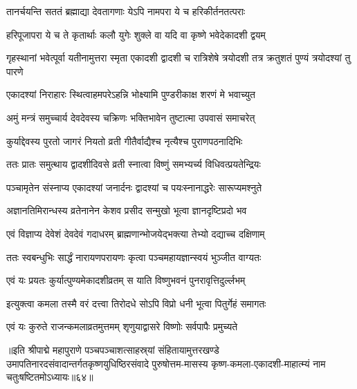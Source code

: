\twolineshloka
{तानर्चयन्ति सततं ब्रह्माद्या देवतागणाः}
{येऽपि नामपरा ये च हरिकीर्तनतत्पराः}%

\twolineshloka
{हरिपूजापरा ये च ते कृतार्थाः कलौ युगेः}
{शुक्ले वा यदि वा कृष्णे भवेदेकादशी द्वयम्}%

\threelineshloka
{गृहस्थानां भवेत्पूर्वा यतीनामुत्तरा स्मृता}
{एकादशी द्वादशी च रात्रिशेषे त्रयोदशी}
{तत्र क्रतुशतं पुण्यं त्रयोदश्यां तु पारणे}%

\twolineshloka
{एकादश्यां निराहारः स्थित्वाहमपरेऽहन्नि}
{भोक्ष्यामि पुण्डरीकाक्ष शरणं मे भवाच्युत}%

\twolineshloka
{अमुं मन्त्रं समुच्चार्य देवदेवस्य चक्रिणः}
{भक्तिभावेन तुष्टात्मा उपवासं समाचरेत्}%

\twolineshloka
{कुर्याद्देवस्य पुरतो जागरं नियतो व्रती}
{गीतैर्वाद्यैश्च नृत्यैश्च पुराणपठनादिभिः}%

\twolineshloka
{ततः प्रातः समुत्थाय द्वादशीदिवसे व्रती}
{स्नात्वा विष्णुं समभ्यर्च्य विधिवत्प्रयतेन्द्रियः}%

\twolineshloka
{पञ्चामृतेन संस्नाप्य एकादश्यां जनार्दनः}
{द्वादश्यां च पयःस्नानाद्धरेः सारूप्यमश्नुते}%

\twolineshloka
{अज्ञानतिमिरान्धस्य व्रतेनानेन केशव}
{प्रसीद सन्मुखो भूत्वा ज्ञानदृष्टिप्रदो भव}%

\twolineshloka
{एवं विज्ञाप्य देवेशं देवदेवं गदाधरम्}
{ब्राह्मणान्भोजयेद्भक्त्या तेभ्यो दद्याच्च दक्षिणाम्}%

\twolineshloka
{ततः स्वबन्धुभिः सार्द्धं नारायणपरायणः}
{कृत्वा पञ्चमहायज्ञान्स्वयं भुञ्जीत वाग्यतः}%

\twolineshloka
{एवं यः प्रयतः कुर्यात्पुण्यमेकादशीव्रतम्}
{स याति विष्णुभवनं पुनरावृत्तिदुर्ल्लभम्}%

\twolineshloka
{इत्युक्त्वा कमला तस्मै वरं दत्त्वा तिरोदधे}
{सोऽपि विप्रो धनी भूत्वा पितुर्गेहं समागतः}%


\twolineshloka
{एवं यः कुरुते राजन्कमलाव्रतमुत्तमम्}
{शृणुयाद्वासरे विष्णोः सर्वपापैः प्रमुच्यते}%

॥इति श्रीपाद्मे महापुराणे पञ्चपञ्चाशत्साहस्र्यां संहितायामुत्तरखण्डे उमापतिनारदसंवादान्तर्गतकृष्णयुधिष्ठिरसंवादे पुरुषोत्तम-मासस्य कृष्ण-कमला-एकादशी-माहात्म्यं नाम चतुःषष्टितमोऽध्यायः॥६४॥


\hyperref[sec:ekadashi_mahatmyam_padma_puranam]{\closesub}
\clearpage

\label{sec:padma-purushottama-masasya shukla-kamada}


